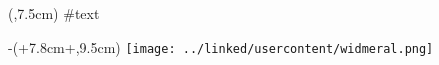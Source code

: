 \begin{textblock*}{7.6cm}(\border,7.5cm)
#text
\end{textblock*}
\begin{textblock*}{\textwidth-4.5cm-\columnsep}(\border+7.8cm+\columnsep,9.5cm)
\noindent
\texttt{[image: ../linked/usercontent/widmeral.png]}
\end{textblock*}
\vspace*{15cm}
